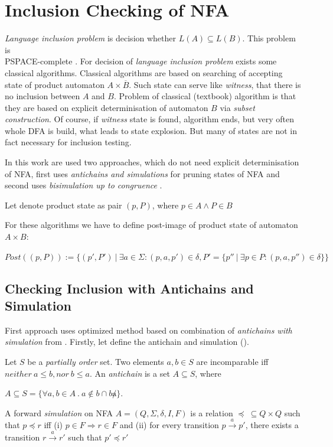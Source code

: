 \chapter{Inclusion Checking of NFA}
\label{chapInclusion}
\emph{Language inclusion problem} is decision whether $L(A) \subseteq L(B)$. 
This problem is\\ PSPACE-complete \cite{cav06}. For decision of \emph{language inclusion problem} exists some classical algorithms.
Classical algorithms are based on searching of accepting state of product automaton $A\times \overline{B}$. Such state can serve like \emph{witness}, that
there is no inclusion between $A$ and $B$. Problem of classical (textbook) algorithm is that they are based on explicit determinisation of automaton $B$ 
via \emph{subset construction}. Of course, if \emph{witness} state is found, algorithm ends, but very often whole DFA is build, what leads to state explosion.
But many of states are not in fact necessary for inclusion testing. 

In this work are used two approaches, which do not need explicit determinisation of NFA, 
first uses \emph{antichains and simulations} \cite{cav06,tacas10} for pruning states of NFA and second uses \emph{bisimulation up to congruence} \cite{popl13}.

Let denote product state as pair $(p,P)$, where $p\in A \wedge P \in B$ 

For these algorithms we have to define post-image of product state of automaton $A\times B$:\
\begin{definition}
$Post((p,P)):=\{(p',P')\ |\ \exists a \in \Sigma: (p,a,p')\in \delta, P'=\{p''\ |\ \exists p \in P:(p,a,p'')\in \delta\}\}$
\end{definition}

\section{Checking Inclusion with Antichains and Simulation}
First approach uses optimized method based on combination of \emph{antichains with simulation} from \cite{tacas10}.
Firstly, let define the antichain and simulation (\cite{simulations}).
\begin{definition}
\label{defAntichains}
	Let $S$ be a \emph{partially order} set. Two elements $a,b\in S$ are incomparable iff $neither\ a \leq b, nor\ b \leq a$.
	An \emph{antichain} is a set $A \subseteq S$, where
	\begin{description}	
		\item $A \subseteq S =\{\forall a,b \in A\ .\ a\not\in b \cap b \not a\}$. 
	\end{description}	
\end{definition}
\begin{definition}
\label{defSimulation}
		A forward \emph{simulation} on NFA $A=(Q,\Sigma,\delta,I,F)$ is a relation $\preceq\  \subseteq Q \times Q$ such that $p \preceq r$ iff (i) $p \in F 
		\Rightarrow r \in F$ and (ii) for every transition $p \xrightarrow{a} p'$, there exists a transition $r \xrightarrow{a} r'$ such that $p' \preceq r'$ 
\end{definition}


